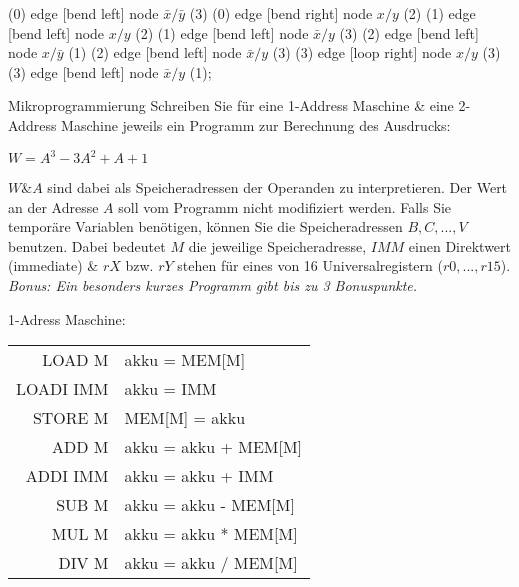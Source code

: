 \documentclass{exercisesheet}
\begin{document}
\begin{solutions}
{    
    (0) edge [bend left] node {$\bar x/\bar y$} (3)
    (0) edge [bend right] node {$x/y$} (2)
    (1) edge [bend left] node {$x/y$} (2)
    (1) edge [bend left] node {$\bar x/y$} (3)
    (2) edge [bend left] node {$x/\bar y$} (1)
    (2) edge [bend left] node {$\bar x/y$} (3)
    (3) edge [loop right] node {$x/y$} (3)
    (3) edge [bend left] node {$\bar x/y$} (1);
  }
\end{solutions}

\begin{exercise}{Mikroprogrammierung}
  Schreiben Sie für eine 1-Address Maschine \& eine 2-Address Maschine jeweils ein Programm zur Berechnung des Ausdrucks:\par
  \begin{center}$W = A^3 - 3A^2 + A + 1$\end{center}
  $W$\&$A$ sind dabei als Speicheradressen der Operanden zu interpretieren. Der Wert an der Adresse $A$ soll vom Programm nicht modifiziert werden. Falls Sie temporäre Variablen benötigen, können Sie die Speicheradressen $B, C, ..., V$ benutzen. Dabei bedeutet $M$ die jeweilige Speicheradresse, $IMM$ einen Direktwert (immediate) \& $rX$ bzw. $rY$ stehen für eines von 16 Universalregistern ($r0, ..., r15$).\\
  \textit{Bonus: Ein besonders kurzes Programm gibt bis zu 3 Bonuspunkte.}
  \begin{multicols}{2}
    1-Adress Maschine:\par
    \begin{tabular}{|r|l|}
      \hline
      LOAD M    & akku = MEM[M]        \\
      LOADI IMM & akku = IMM           \\
      STORE M   & MEM[M] = akku        \\
      ADD M     & akku = akku + MEM[M] \\
      ADDI IMM  & akku = akku + IMM    \\
      SUB M     & akku = akku - MEM[M] \\
      MUL M     & akku = akku * MEM[M] \\
      DIV M     & akku = akku / MEM[M] \\
      \hline
    \end{tabular}
    \columnbreak


\end{multicols}
\end{exercise}
\end{document}
